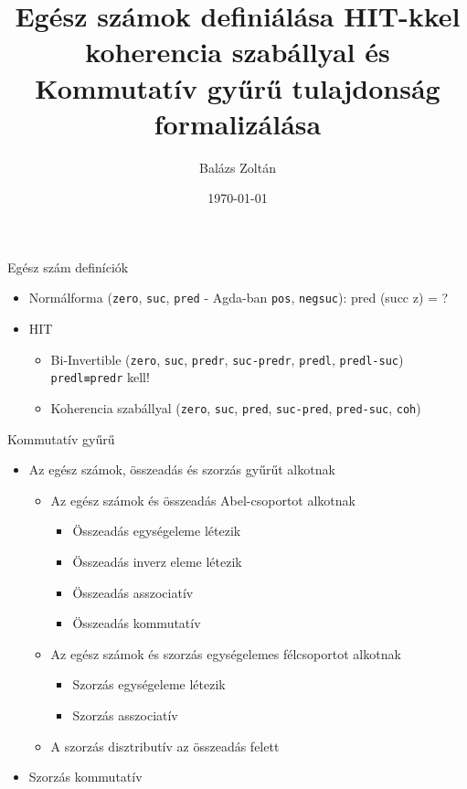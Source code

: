 \documentclass[14pt, aspectratio=1610]{beamer}
\title{Egész számok definiálása HIT-kkel koherencia szabállyal és Kommutatív gyűrű tulajdonság formalizálása}
\institute{Eötvös Loránd Tudományegyetem}
\author{Balázs Zoltán}
\date{\today}
\begin{document}
\maketitle

\begin{frame}[fragile]{Egész szám definíciók}

\begin{itemize}[<+->]
  \item Normálforma (\texttt{zero}, \texttt{suc}, \texttt{pred} - Agda-ban \texttt{pos}, \texttt{negsuc}): pred (succ z) = ?
  \item HIT
    \begin{itemize}[<+->]
      \item Bi-Invertible (\texttt{zero}, \texttt{suc}, \texttt{predr}, \texttt{suc-predr}, \texttt{predl}, \texttt{predl-suc}) \texttt{predl≡predr} kell!
      \item Koherencia szabállyal (\texttt{zero}, \texttt{suc}, \texttt{pred}, \texttt{suc-pred}, \texttt{pred-suc}, \texttt{coh})
    \end{itemize}
\end{itemize}

\end{frame}

\begin{frame}[fragile]{Kommutatív gyűrű}

\begin{itemize}[<+->]
    \item Az egész számok, összeadás és szorzás gyűrűt alkotnak
      \begin{itemize}[<+->]
        \item Az egész számok és összeadás Abel-csoportot alkotnak
          \begin{itemize}[<+->]
            \item Összeadás egységeleme létezik
            \item Összeadás inverz eleme létezik
            \item Összeadás asszociatív
            \item Összeadás kommutatív
          \end{itemize}
        \item Az egész számok és szorzás egységelemes félcsoportot alkotnak
          \begin{itemize}[<+->]
            \item Szorzás egységeleme létezik
            \item Szorzás asszociatív
          \end{itemize}
        \item A szorzás disztributív az összeadás felett
      \end{itemize}
    \item Szorzás kommutatív
\end{itemize}

\end{frame}
\end{document}
